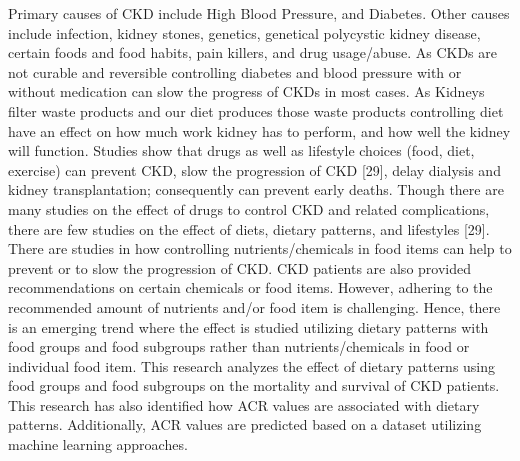 \noindent Primary causes of CKD include High Blood Pressure, and Diabetes. Other causes include infection, kidney stones, genetics, genetical polycystic kidney disease, certain foods and food habits, pain killers, and drug usage/abuse. As CKDs are not curable and reversible controlling diabetes and blood pressure with or without medication can slow the progress of CKDs in most cases. As Kidneys filter waste products and our diet produces those waste products controlling diet have an effect on how much work kidney has to perform, and how well the kidney will function. Studies show that drugs as well as lifestyle choices (food, diet, exercise) can prevent CKD, slow the progression of CKD [29], delay dialysis and kidney transplantation; consequently can prevent early deaths. Though there are many studies on the effect of drugs to control CKD and related complications, there are few studies on the effect of diets, dietary patterns, and lifestyles [29]. There  are studies in how controlling nutrients/chemicals in food items can help to prevent or to slow the progression of CKD. CKD patients are also provided recommendations on certain chemicals or food items. However, adhering to the recommended amount of nutrients and/or food item is challenging. Hence, there is an emerging trend where the effect is studied utilizing  dietary patterns with food groups and food subgroups rather than nutrients/chemicals in food or individual food item. This research analyzes the effect of dietary patterns using food groups and food subgroups on  the mortality and survival of CKD patients. This research has also identified how ACR values are associated with dietary patterns. Additionally, ACR values are predicted based on a dataset utilizing machine learning approaches.

